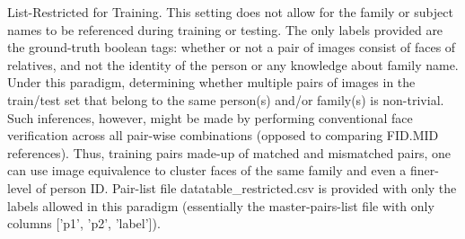 \begin{step}{List-Restricted for Training.}\label{1ststep} 
This setting does not allow for the family or subject names to be referenced during training or testing. The only labels provided are the ground-truth boolean tags: whether or not a pair of images consist of faces of relatives, and not the identity of the person or any knowledge about family name. Under this paradigm, determining whether multiple pairs of images in the train/test set that belong to the same person(s) and/or family(s) is non-trivial. Such inferences, however, might be made by performing conventional face verification across all pair-wise combinations (\ie opposed to comparing FID.MID references). Thus, training pairs made-up of matched and mismatched pairs, one can use image equivalence to cluster faces of the same family and even a finer-level of person ID. Pair-list file datatable\_restricted.csv is provided with only the labels allowed in this paradigm (\ie essentially the master-pairs-list file with only columns ['p1', 'p2', 'label']).
    \end{step}
